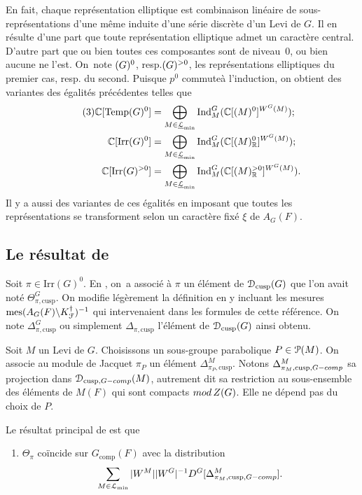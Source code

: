 \documentclass[11pt]{article}
\newcommand{\resp}{resp.\xspace}
\numberwithin{equation}{section}\providecommand{\og}{«\,}\providecommand{\fg}{\,»}
\let\mathcal \EuScript
\newcommand{\NoChangel}[1]{%
\expandafter\let\csname old\string#1\endcsname=#1
\let#1=\relax
\newcommand{#1}{\mathcode`l="716C\csname old\string#1\endcsname\mathcode`l="7160 }%
}
\newcommand{\rmod}{\textup{mod}\,}
\newcommand{\comp}{\mathrm{comp}}
\newcommand{\tcomp}{\textup{-comp}}
\newcommand{\cusp}{\mathrm{cusp}}
\newcommand{\Ell}{\mathrm{Ell}} \NoChangel{\Ell}
\newcommand{\Ind}{\mathrm{Ind}}
\newcommand{\Irr}{\mathrm{Irr}}
\newcommand{\Temp}{\mathrm{Temp}}
\DeclareMathOperator{\mes}{mes}
\newcommand{\cD}{\mathcal{D}}
\newcommand{\cF}{\mathcal{F}}
\newcommand{\cL}{\mathcal{L}}
\newcommand{\cP}{\mathcal{P}}
\newcommand{\CC}{\mathbb{C}}
\newcommand{\RR}{\mathbb{R}}
\theoremstyle{plain}
\theoremstyle{definition}
\begin{document}
En fait, chaque représentation elliptique est combinaison linéaire de sous-repré\-sen\-tations d'une même induite d'une série discrète d'un Levi de $G$. Il en résulte d'une part que toute représentation elliptique admet un caractère central. D'autre part que ou bien toutes ces composantes sont de niveau~$0$, ou bien aucune ne l'est. On~note $\Ell(G)^0$, \resp $\Ell(G)^{>0}$, les représentations elliptiques du premier cas, \resp du second. Puisque $p^0$ \og commute\fg à l'induction, on obtient des variantes des égalités précédentes telles que
\begin{align*}\tag{3}\label{representationselliptiques3}
\CC[\Temp(G)^0]&=\bigoplus_{M\in\underline{\cL}_{\min}}\Ind_{M}^G(\CC[\Ell(M)^0]^{W^G(M)});\\\CC[\Irr(G)^0]&=\bigoplus_{M\in\underline{\cL}_{\min}}\Ind_{M}^G(\CC[\Ell(M)^0_{\RR}]^{W^G(M)});\\
\CC[\Irr(G)^{>0}]&=\bigoplus_{M\in\underline{\cL}_{\min}}\Ind_{M}^G(\CC[\Ell(M)_{\RR}^{>0}]^{W^G(M)}).
\end{align*}
Il y a aussi des variantes de ces égalités en imposant que toutes les représentations se transforment selon un caractère fixé $\xi$ de $A_{G}(F)$.

\subsection{Le résultat de \texorpdfstring{\cite{W2}}{W2}}\label{leresultat}

Soit $\pi\in \Irr(G)^0$. En \cite{W2}, on~a associé à $\pi$ un élément de $ \cD_{\cusp}(G)$ que l'on avait noté $\Theta^G_{\pi,\cusp}$. On modifie légèrement la définition en y incluant les mesures $\mes(A_{G}(F)\backslash K_{\cF}^{\dag})^{-1}$ qui intervenaient dans les formules de cette référence. On note $\Delta^G_{\pi,\cusp}$ ou simplement $\Delta_{\pi,\cusp}$ l'élément de $\cD_{\cusp}(G)$ ainsi obtenu.

Soit $M$ un Levi de $G$. Choisissons un sous-groupe parabolique $P\in \cP(M)$. On associe au module de Jacquet $\pi_{P}$ un élément $\Delta^M_{\pi_{P},\cusp}$. Notons $\Delta^M_{\pi_{M},\cusp,G\tcomp}$ sa projection dans $\cD_{\cusp,G\tcomp}(M)$, autrement dit sa restriction au sous-ensemble des éléments de $M(F)$ qui sont compacts $\rmod Z(G)$. Elle ne dépend pas du choix de $P$.

Le résultat principal de \cite{W2} est que
\begin{enumerate}
\item\label{leresultat1}
$\Theta_{\pi}$ coïncide sur $G_{\comp}(F)$ avec la distribution
\[
\sum_{M\in \cL_{\min}}\vert W^M\vert \vert W^G\vert ^{-1}D^G[\Delta^M_{\pi_{M},\cusp,G\tcomp}].
\]
\end{enumerate}
\end{document}
